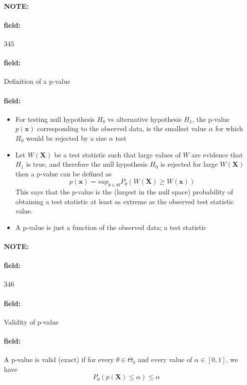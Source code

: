\documentclass[12pt]{article}
\newenvironment{note}{\paragraph{NOTE:}}{}
\newenvironment{field}{\paragraph{field:}}{}
\begin{document}
\begin{note}
    \begin{field}
        \tiny 345
    \end{field}
    \begin{field}
        Definition of a p-value
    \end{field}
    \begin{field}
        \begin{itemize}
          \item For testing null hypothesis $H_0$ vs alternative hypothesis $H_1$, the p-value $p(\mathbf{x})$ corresponding to the observed data, is the smallest value $\alpha$ for which $H_0$ would be rejected by a size $\alpha$ test
          \item Let $W(\mathbf{X})$ be a test statistic such that large values of $W$ are evidence that $H_1$ is true, and therefore the null hypothesis $H_0$ is rejected for large $W(\mathbf{X})$ then a p-value can be defined as $$p(\mathbf{x}) = sup_{\theta \in \Theta}P_\theta(W(\mathbf{X})\geq W(\mathbf{x}))$$ This says that the p-value is the (largest in the null space) probability of obtaining a test statistic at least as extreme as the observed test statistic value.
          \item A p-value is just a function of the observed data; a test statistic
        \end{itemize}
    \end{field}
\end{note}

\begin{note}
    \begin{field}
        \tiny 346
    \end{field}
    \begin{field}
        Validity of p-value
    \end{field}
    \begin{field}
        A p-value is valid (exact) if for every $\theta \in \Theta_0$ and every value of $\alpha \in [0,1]$, we have
        $$P_\theta(p(\mathbf{X})\leq \alpha )\leq \alpha  $$
    \end{field}
\end{note}
\end{document}
